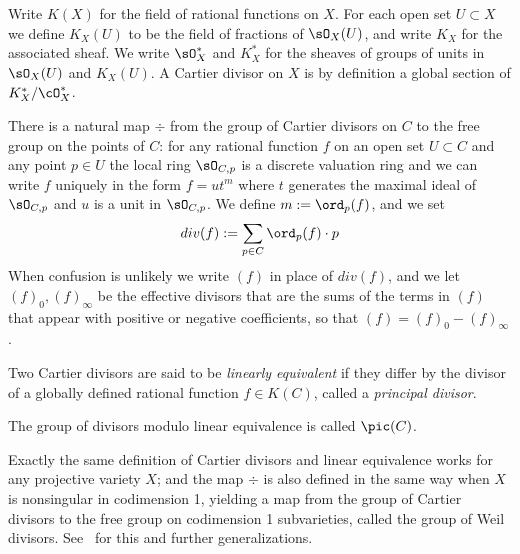 Write $K(X)$ for the field of rational functions on $X$.
For each open set $U\subset X$ we define $K_X(U)$ to be the field of fractions of $\sO_X(U)$, and write $K_X$ for the
associated sheaf. We write $\sO_X^*$ and $K_X^*$ for the sheaves of groups of units in $\sO_X(U)$ and $K_X(U)$.
A Cartier divisor on $X$ is by definition a global section of $K_X^*/\cO_X^*$.

There is a natural map $\div$
from the group of Cartier divisors on $C$ to the free group on the points of $C$:
 for any rational function $f$ on an open set $U\subset C$
and any 
point $p\in U$ the local ring $\sO_{C,p}$ is a discrete valuation
ring and we can write $f$ uniquely in the form $f = ut^m$ where $t$ generates
the maximal ideal of $\sO_{C,p}$ and $u$ is a unit in $\sO_{C,p}$. We define
$m:= \ord_p(f)$, and we set
$$
div(f) := \sum_{p\in C}\ord_p(f) \cdot p
$$
When
confusion is unlikely we write $(f) $ in place of $div(f)$, and we let
$(f)_0, (f)_\infty$ be the effective divisors that are the sums of the terms in $(f)$ that appear with positive
or  negative coefficients, so that $(f) = (f)_0-(f)_\infty$. 

Two Cartier divisors are said to be \emph{linearly equivalent}
if they differ by the divisor of a globally defined rational function $f \in K(C)$, called a \emph{principal divisor}.
\begin{definition}
The group of divisors modulo linear equivalence is called $\pic(C)$.
\end{definition}
 
Exactly the same definition of Cartier divisors and linear equivalence works for any projective variety $X$; and
the map $\div$ is also defined in the same way when $X$ is nonsingular in codimension 1, yielding
a map from the group of Cartier divisors to the free group on
codimension 1 subvarieties, called the group of Weil divisors. See~\cite{Hartshorne1977} for this and further generalizations. 
 
